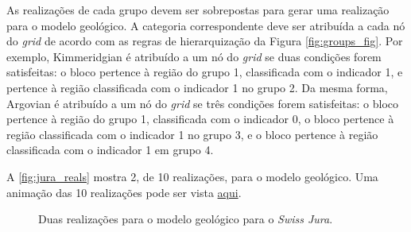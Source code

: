As realizações de cada grupo devem ser sobrepostas para gerar uma realização para o modelo geológico. A categoria correspondente deve ser atribuída a cada nó do \textit{grid} de acordo com as regras de hierarquização da Figura \autoref{fig:groups_fig}. Por exemplo, Kimmeridgian é atribuído a um nó do \textit{grid} se duas condições forem satisfeitas: o bloco pertence à região do grupo 1, classificada com o indicador 1, e pertence à região classificada com o indicador 1 no grupo 2. Da mesma forma, Argovian é atribuído a um nó do \textit{grid} se três condições forem satisfeitas: o bloco pertence à região do grupo 1, classificada com o indicador 0, o bloco pertence à região classificada com o indicador 1 no grupo 3, e o bloco pertence à região classificada com o indicador 1 em grupo 4.

A \autoref{fig:jura_reals} mostra 2, de 10 realizações, para o modelo geológico. Uma animação das 10 realizações pode ser vista \href{https://github.com/robertorolo/hierarchical_boundary_simulation/blob/main/jura_gif.gif}{aqui}.

\begin{figure}[H] 
    \centering
    \caption{Duas realizações para o modelo geológico para o \textit{Swiss Jura}.} \label{fig:jura_reals}
     \hspace{1em}
\end{figure}

